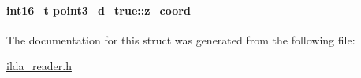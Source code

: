 \paragraph[{\texorpdfstring{z\+\_\+coord}{z_coord}}]{\setlength{\rightskip}{0pt plus 5cm}int16\+\_\+t point3\+\_\+d\+\_\+true\+::z\+\_\+coord}\hypertarget{structpoint3__d__true_aad4fd09f85d4f8c7d7aa1bf80f7fc7c3}{}\label{structpoint3__d__true_aad4fd09f85d4f8c7d7aa1bf80f7fc7c3}


The documentation for this struct was generated from the following file\+:\begin{DoxyCompactItemize}
\item 
\hyperlink{ilda__reader_8h}{ilda\+\_\+reader.\+h}\end{DoxyCompactItemize}
